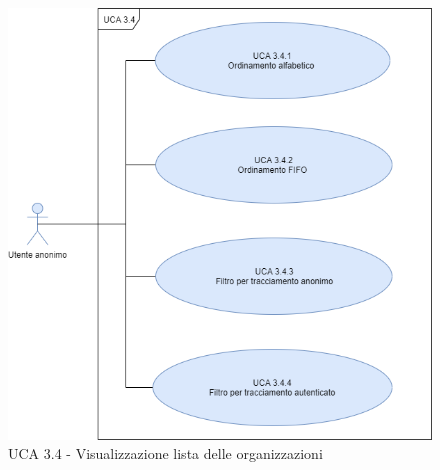 \begin{figure}[h]
	\centering	
	\includegraphics[scale=0.5]{sezioni/UseCase/Immagini/UCA3.4.png}
	\caption{UCA 3.4 - Visualizzazione lista delle organizzazioni}
\end{figure}

